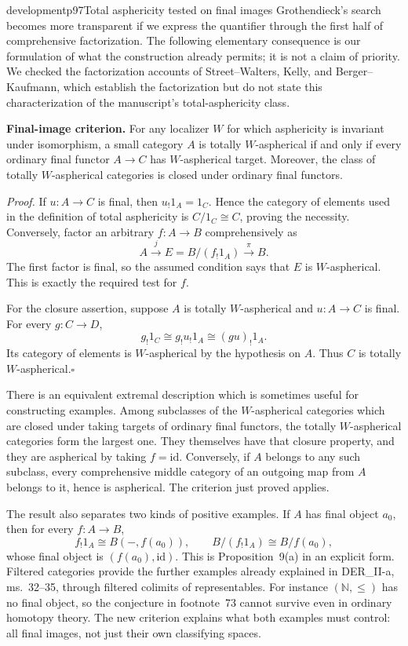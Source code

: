 \begin{dcomment}{development}{p97}{Total asphericity tested on final images}
Grothendieck's search becomes more transparent if we express the quantifier through the first half of comprehensive factorization. The following elementary consequence is our formulation of what the construction already permits; it is not a claim of priority. We checked the factorization accounts of Street--Walters, Kelly, and Berger--Kaufmann, which establish the factorization but do not state this characterization of the manuscript's total-asphericity class.

\noindent\textbf{Final-image criterion.}\ours\quad
For any localizer $W$ for which asphericity is invariant under isomorphism, a small category $A$ is totally $W$-aspherical if and only if every ordinary final functor $A\to C$ has $W$-aspherical target. Moreover, the class of totally $W$-aspherical categories is closed under ordinary final functors.

\emph{Proof.} If $u:A\to C$ is final, then $u_!1_A=1_C$. Hence the category of elements used in the definition of total asphericity is $C/1_C\cong C$, proving the necessity. Conversely, factor an arbitrary $f:A\to B$ comprehensively as
\[
A\xrightarrow{j}E=B/(f_!1_A)\xrightarrow{\pi}B.
\]
The first factor is final, so the assumed condition says that $E$ is $W$-aspherical. This is exactly the required test for $f$.

For the closure assertion, suppose $A$ is totally $W$-aspherical and $u:A\to C$ is final. For every $g:C\to D$,
\[
g_!1_C\cong g_!u_!1_A\cong(gu)_!1_A.
\]
Its category of elements is $W$-aspherical by the hypothesis on $A$. Thus $C$ is totally $W$-aspherical.\hfill$\square$

There is an equivalent extremal description which is sometimes useful for constructing examples. Among subclasses of the $W$-aspherical categories which are closed under taking targets of ordinary final functors, the totally $W$-aspherical categories form the largest one. They themselves have that closure property, and they are aspherical by taking $f=\mathrm{id}$. Conversely, if $A$ belongs to any such subclass, every comprehensive middle category of an outgoing map from $A$ belongs to it, hence is aspherical. The criterion just proved applies.

The result also separates two kinds of positive examples. If $A$ has final object $a_0$, then for every $f:A\to B$,
\[
f_!1_A\cong B(-,f(a_0)),\qquad
B/(f_!1_A)\cong B/f(a_0),
\]
whose final object is $(f(a_0),\mathrm{id})$. This is Proposition~9(a) in an explicit form. Filtered categories provide the further examples already explained in DER\_II-a, ms.~32--35, through filtered colimits of representables. For instance $(\mathbb N,\leq)$ has no final object, so the conjecture in footnote~73 cannot survive even in ordinary homotopy theory. The new criterion explains what both examples must control: all final images, not just their own classifying spaces.
\end{dcomment}

